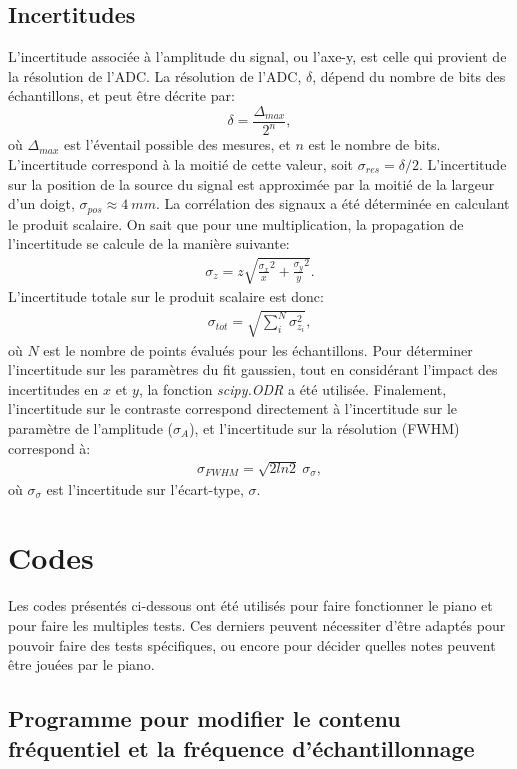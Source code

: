 ﻿\documentclass[11pt,letterpaper]{article}
\begin{document}
\subsection{Incertitudes}\label{inc}
L'incertitude associée à l'amplitude du signal, ou l'axe-y, est celle qui provient de la résolution 
de l'ADC. La résolution de l'ADC, $\delta$, dépend du nombre de bits des échantillons, et peut être décrite par:
\[\delta=\frac{\Delta_{max}}{2^{n}},\]
où $\Delta_{max}$ est l'éventail possible des mesures, et $n$ est le nombre de bits. L'incertitude correspond
à la moitié de cette valeur, soit $\sigma_{res}=\delta/2$. L'incertitude sur la position de la source du signal
est approximée par la moitié de la largeur d'un doigt, $\sigma_{pos}\approx4\ mm$. La corrélation des signaux a été déterminée
en calculant le produit scalaire. On sait que pour une multiplication, la propagation de l'incertitude se calcule de la
manière suivante:
\begin{align*}
  \sigma_{z}=z \sqrt{\frac{\sigma_x}{x}^2+\frac{\sigma_y}{y}^2}.
\end{align*}
L'incertitude totale sur le produit scalaire est donc:
\begin{align*}
  \sigma_{tot}=\sqrt{\sum_i^{N} \sigma_{z_i}^2},
\end{align*}
où $N$ est le nombre de points évalués pour les échantillons. Pour déterminer l'incertitude sur les
paramètres du fit gaussien, tout en considérant l'impact des incertitudes en $x$ et $y$, la fonction \textit{scipy.ODR}
a été utilisée. Finalement, l'incertitude sur le contraste correspond directement à l'incertitude sur le paramètre de
l'amplitude ($\sigma_{A}$), et l'incertitude sur la résolution (FWHM) correspond à:
\begin{align*}
  \sigma_{FWHM}=\sqrt{2ln2}\ \sigma_{\sigma},
\end{align*}
où $\sigma_{\sigma}$ est l'incertitude sur l'écart-type, $\sigma$.



\section{Codes}

Les codes présentés ci-dessous ont été utilisés pour faire fonctionner le piano et pour faire les
multiples tests. Ces derniers peuvent nécessiter d'être adaptés pour pouvoir faire des tests
spécifiques, ou encore pour décider quelles notes peuvent être jouées par le piano.

\subsection{Programme pour modifier le contenu fréquentiel et la fréquence d'échantillonnage}
\end{document}
